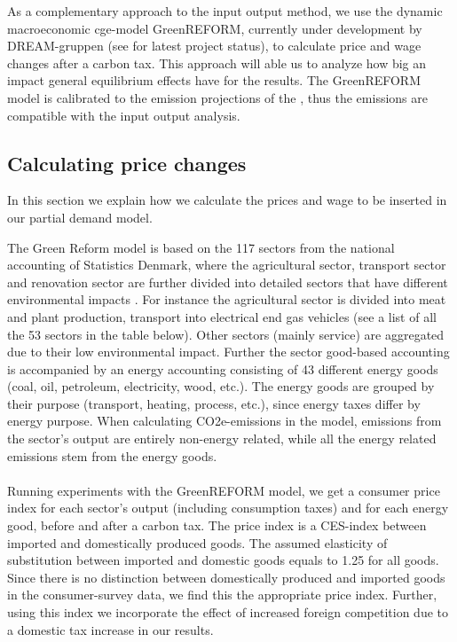 As a complementary approach to the input output method, we use the dynamic macroeconomic cge-model GreenREFORM, currently under development by DREAM-gruppen (see \cite{GR_status} for latest project status), to calculate price and wage changes after a carbon tax. This approach will able us to analyze how big an impact general equilibrium effects have for the results. The GreenREFORM model is calibrated to the emission projections of the \cite{kf21}, thus the emissions are compatible with the input output analysis.

\subsection{Calculating price changes} In this section we explain how we calculate the prices and wage to be inserted in our partial demand model.

The Green Reform model is based on the 117 sectors from the national accounting of Statistics Denmark, where the agricultural sector, transport sector and renovation sector are further divided into detailed sectors that have different environmental impacts \citep{GR_brancher}. For instance the agricultural sector is divided into meat and plant production, transport into electrical end gas vehicles (see a list of all the 53 sectors in the table below). Other sectors (mainly service) are aggregated due to their low  environmental impact. 
Further the sector good-based accounting is accompanied by an energy accounting consisting of 43 different energy goods (coal, oil, petroleum, electricity, wood, etc.). The energy goods are grouped by their purpose (transport, heating, process, etc.), since energy taxes differ by energy purpose. 
When calculating CO2e-emissions in the model, emissions from the sector's output are entirely non-energy related, while all the energy related emissions stem from the energy goods.
\\
\\
Running experiments with the GreenREFORM model, we get a consumer price index for each sector's output (including consumption taxes) and for each energy good, before and after a carbon tax. The price index is a CES-index between imported and domestically produced goods. The assumed elasticity of substitution between imported and domestic goods equals to 1.25 for all goods. Since there is no distinction between domestically produced and imported goods in the consumer-survey data, we find this the appropriate price index. Further, using this index we incorporate the effect of increased foreign competition due to a domestic tax increase in our results.

